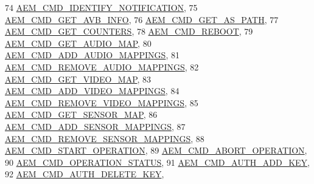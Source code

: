 \begin{DoxyCode}
74     \hyperlink{namespaceavdecc__lib_a1631d53b37995d16b597a5e1a78c55a5abc27165e60df7dfa64c2c41c8ad9ca90}{AEM\_CMD\_IDENTIFY\_NOTIFICATION},
75     \hyperlink{namespaceavdecc__lib_a1631d53b37995d16b597a5e1a78c55a5a3f4c19c89a89e5b2f0f00308483bf1e3}{AEM\_CMD\_GET\_AVB\_INFO},
76     \hyperlink{namespaceavdecc__lib_a1631d53b37995d16b597a5e1a78c55a5a06f4c39798c889afcc63bec8ad3324db}{AEM\_CMD\_GET\_AS\_PATH},
77     \hyperlink{namespaceavdecc__lib_a1631d53b37995d16b597a5e1a78c55a5a84d4ec2199eb74325c793bf3613edf64}{AEM\_CMD\_GET\_COUNTERS},
78     \hyperlink{namespaceavdecc__lib_a1631d53b37995d16b597a5e1a78c55a5a09843e4f8e36dc18f533905d1063a321}{AEM\_CMD\_REBOOT},
79     \hyperlink{namespaceavdecc__lib_a1631d53b37995d16b597a5e1a78c55a5ac1eb09ec7f1bff9dddd89e2d29fadaa2}{AEM\_CMD\_GET\_AUDIO\_MAP},
80     \hyperlink{namespaceavdecc__lib_a1631d53b37995d16b597a5e1a78c55a5aa8d49e500f722c215561412b3d236bd3}{AEM\_CMD\_ADD\_AUDIO\_MAPPINGS},
81     \hyperlink{namespaceavdecc__lib_a1631d53b37995d16b597a5e1a78c55a5a119c96dad55443743c0e36d0c3dd3cee}{AEM\_CMD\_REMOVE\_AUDIO\_MAPPINGS},
82     \hyperlink{namespaceavdecc__lib_a1631d53b37995d16b597a5e1a78c55a5a746e648bd44df9b079ffdee575c8840c}{AEM\_CMD\_GET\_VIDEO\_MAP},
83     \hyperlink{namespaceavdecc__lib_a1631d53b37995d16b597a5e1a78c55a5a54505d29c1fe10a1f6ad23a9d045898f}{AEM\_CMD\_ADD\_VIDEO\_MAPPINGS},
84     \hyperlink{namespaceavdecc__lib_a1631d53b37995d16b597a5e1a78c55a5ae54f8d7c132575b5302e46630d472e57}{AEM\_CMD\_REMOVE\_VIDEO\_MAPPINGS},
85     \hyperlink{namespaceavdecc__lib_a1631d53b37995d16b597a5e1a78c55a5a31957586afa449bcabb88f2cdc85ae4b}{AEM\_CMD\_GET\_SENSOR\_MAP},
86     \hyperlink{namespaceavdecc__lib_a1631d53b37995d16b597a5e1a78c55a5a68ec843798317b244c8654a4b67b2cea}{AEM\_CMD\_ADD\_SENSOR\_MAPPINGS},
87     \hyperlink{namespaceavdecc__lib_a1631d53b37995d16b597a5e1a78c55a5ae7b2580530c311943deef8715cac4888}{AEM\_CMD\_REMOVE\_SENSOR\_MAPPINGS},
88     \hyperlink{namespaceavdecc__lib_a1631d53b37995d16b597a5e1a78c55a5a625cac78de378e66fe75ed1bde53768f}{AEM\_CMD\_START\_OPERATION},
89     \hyperlink{namespaceavdecc__lib_a1631d53b37995d16b597a5e1a78c55a5a8c683dd440d4dfbcc1a6ffbf444a0953}{AEM\_CMD\_ABORT\_OPERATION},
90     \hyperlink{namespaceavdecc__lib_a1631d53b37995d16b597a5e1a78c55a5a79c289e1c75f6792d9f889120e78145d}{AEM\_CMD\_OPERATION\_STATUS},
91     \hyperlink{namespaceavdecc__lib_a1631d53b37995d16b597a5e1a78c55a5af25fea13f3ae787abb1a9ecc3f1d7961}{AEM\_CMD\_AUTH\_ADD\_KEY},
92     \hyperlink{namespaceavdecc__lib_a1631d53b37995d16b597a5e1a78c55a5ad19950a67b3fdefc6f849f8bf2c9e1d9}{AEM\_CMD\_AUTH\_DELETE\_KEY},

\end{DoxyCode}
